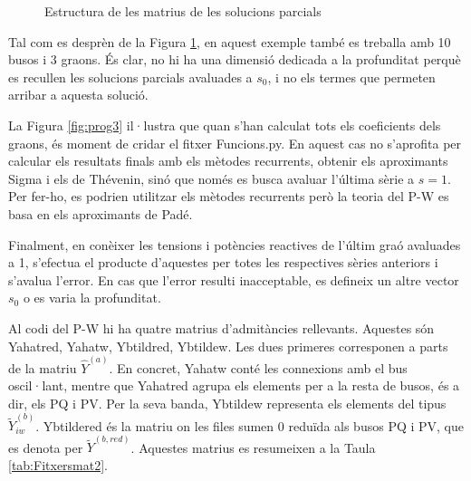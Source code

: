 \begin{figure}[!htb] \footnotesize
  \begin{center}
\caption{Estructura de les matrius de les solucions parcials}
\label{fig:prog5}
\end{center}
\end{figure}

Tal com es desprèn de la Figura \ref{fig:prog5}, en aquest exemple també es treballa amb 10 busos i 3 graons. És clar, no hi ha una dimensió dedicada a la profunditat perquè es recullen les solucions parcials avaluades a $s_0$, i no els termes que permeten arribar a aquesta solució.

La Figura \ref{fig:prog3} il·lustra que quan s'han calculat tots els coeficients dels graons, és moment de cridar el fitxer Funcions.py. En aquest cas no s'aprofita per calcular els resultats finals amb els mètodes recurrents, obtenir els aproximants Sigma i els de Thévenin, sinó que només es busca avaluar l'última sèrie a $s=1$. Per fer-ho, es podrien utilitzar els mètodes recurrents però la teoria del P-W es basa en els aproximants de Padé.

Finalment, en conèixer les tensions i potències reactives de l'últim graó avaluades a 1, s'efectua el producte d'aquestes per totes les respectives sèries anteriors i s'avalua l'error. En cas que l'error resulti inacceptable, es defineix un altre vector $s_0$ o es varia la profunditat.

Al codi del P-W hi ha quatre matrius d'admitàncies rellevants. Aquestes són Yahatred, Yahatw, Ybtildred, Ybtildew. Les dues primeres corresponen a parts de la matriu $\widehat{Y}^{(a)}$. En concret, Yahatw conté les connexions amb el bus oscil·lant, mentre que Yahatred agrupa els elements per a la resta de busos, és a dir, els PQ i PV. Per la seva banda, Ybtildew representa els elements del tipus $\widetilde{Y}^{(b)}_{iw}$. Ybtildered és la matriu on les files sumen 0 reduïda als busos PQ i PV, que es denota per $\widetilde{Y}^{(b,red)}$. 
Aquestes matrius es resumeixen a la Taula \ref{tab:Fitxersmat2}.

